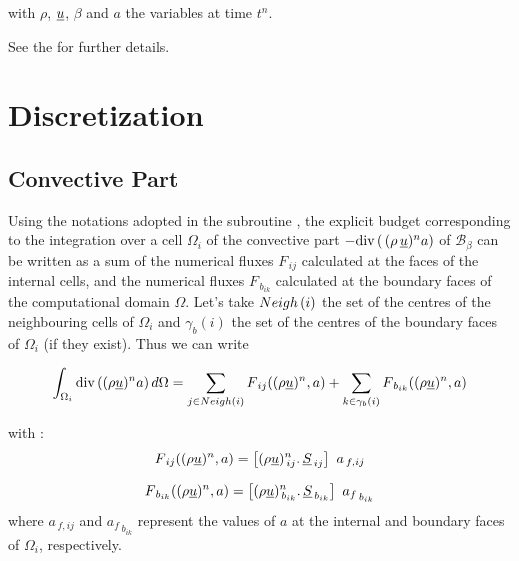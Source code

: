 with $\rho$, $\underline{u}$, $\beta$ and $a$ the variables at time  ${t^n}$.

See the  for further details.

\section*{Discretization}
\subsection*{\bf Convective Part}
Using the notations adopted in the subroutine , the
explicit budget corresponding to the integration over a cell
$\Omega_i$ of the convective part $-{\text{div}\,(\,(\rho\,\underline{u})^n a)}$
of $\mathcal{B_{\mathcal{\beta}}}$ can be written as a sum of the
numerical fluxes $F_{\,ij}$ calculated at the faces of the internal
cells, and the numerical fluxes $F_{\,b_{ik}}$ calculated at the
boundary faces of the computational domain $\Omega$. Let's take
$Neigh\left(i\right)$ the set of the centres of the neighbouring cells of
${\Omega_i}$ and $\gamma_b(i)$ the set of the centres of the boundary
faces of ${\Omega_i}$ (if they exist). Thus we can write

\begin{equation}\notag
\int_{\Omega_i}{\text{div}\,( (\rho \underline{u})^n  a )\, d\Omega} =
\sum_{j\in Neigh\left(i\right)}{F_{\,ij}((\rho \underline{u})^n, a)}
+\sum_{k\in {\gamma_b(i)}} {F_{\,{b}_{ik}}((\rho \underline{u})^n,a)}
\end{equation}

with :
\begin{equation}
F_{\,ij}((\rho \vect{u})^n,a) = \left[{(\rho \vect{u})_{\,ij}^n} \text{.}\, \vect{S}_{\,ij}\right]\ a_{\,f,ij}
\end{equation}

\begin{equation}
F_{\,{b}_{ik}}((\rho \underline{u})^n, a) =  \left[{(\rho \underline{u})_{\,{b}_{ik}}^n} \text{.}\, \underline{S}_{\,{b}_{ik}}\right]\ {a_f}_{\,{b}_{ik}}
\end{equation}
where $a_{\,f,ij}$ and ${a_f}_{\,{b}_{ik}}$ represent the values of
$a$ at the internal and boundary faces of ${\Omega_i}$, respectively.\\

